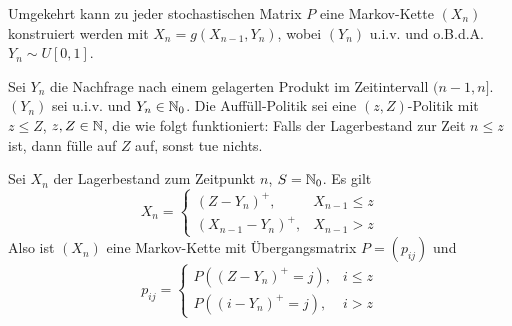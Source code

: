 \documentclass[a4paper,twoside,DIV15,BCOR12mm]{scrbook}
\begin{document}
\begin{bemerkung}
Umgekehrt kann zu jeder stochastischen Matrix $P$ eine Markov-Kette $(X_n)$ konstruiert werden mit $X_n=g(X_{n-1},Y_n)$, wobei $(Y_n)$ u.i.v. und o.B.d.A. $Y_n \sim U[0,1]$.
\end{bemerkung}

\begin{beispiel}[Lagerhaltung]
Sei $Y_n$ die Nachfrage nach einem gelagerten Produkt im Zeitintervall $(n-1,n]$. $(Y_n)$ sei u.i.v. und $Y_n\in \mathbb{N}_0$. Die Auffüll-Politik sei eine $(z,Z)$-Politik mit $z\le Z$, $z,Z\in \mathbb{N}$, die wie folgt funktioniert: Falls der Lagerbestand zur Zeit $n\le z$ ist, dann fülle auf $Z$ auf, sonst tue nichts.

Sei $X_n$ der Lagerbestand zum Zeitpunkt $n$, $S=\mathbb{N}_0$. Es gilt
\[
X_n =
\begin{cases}
(Z - Y_n)^+, & X_{n-1} \le z \\
(X_{n-1} - Y_n)^+, & X_{n-1} > z
\end{cases}
\]
Also ist $(X_n)$ eine Markov-Kette mit Übergangsmatrix $P=(p_{ij})$ und
\[
p_{ij} = 
\begin{cases}
P( (Z-Y_n)^+ = j), & i\le z \\
P( (i-Y_n)^+ = j), & i > z
\end{cases}
\]
\end{beispiel}
\end{document}
